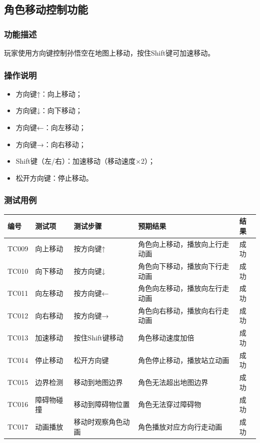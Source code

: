 \documentclass[a4paper,12pt]{article}
\begin{document}
\subsection{角色移动控制功能}

\subsubsection{功能描述}
玩家使用方向键控制孙悟空在地图上移动，按住Shift键可加速移动。

\subsubsection{操作说明}
\begin{itemize}[leftmargin=2em]
    \item 方向键↑：向上移动；
    \item 方向键↓：向下移动；
    \item 方向键←：向左移动；
    \item 方向键→：向右移动；
    \item Shift键（左/右）：加速移动（移动速度$\times$2）；
    \item 松开方向键：停止移动。
\end{itemize}

\subsubsection{测试用例}
\begin{longtable}{p{1.2cm} p{2.8cm} p{4cm} p{3.5cm} p{1.5cm}}
\toprule
\textbf{编号} & \textbf{测试项} & \textbf{测试步骤} & \textbf{预期结果} & \textbf{结果} \\
\midrule
\endhead
TC009 & 向上移动 & 按方向键↑ & 角色向上移动，播放向上行走动画 & 成功 \\
TC010 & 向下移动 & 按方向键↓ & 角色向下移动，播放向下行走动画 & 成功 \\
TC011 & 向左移动 & 按方向键← & 角色向左移动，播放向左行走动画 & 成功 \\
TC012 & 向右移动 & 按方向键→ & 角色向右移动，播放向右行走动画 & 成功 \\
TC013 & 加速移动 & 按住Shift键移动 & 角色移动速度加倍 & 成功 \\
TC014 & 停止移动 & 松开方向键 & 角色停止移动，播放站立动画 & 成功 \\
TC015 & 边界检测 & 移动到地图边界 & 角色无法超出地图边界 & 成功 \\
TC016 & 障碍物碰撞 & 移动到障碍物位置 & 角色无法穿过障碍物 & 成功 \\
TC017 & 动画播放 & 移动时观察角色动画 & 角色播放对应方向行走动画 & 成功 \\
\bottomrule
\end{longtable}
\end{document}

